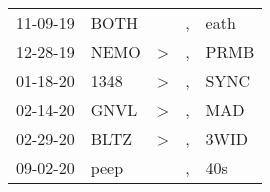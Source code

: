 \begin{supertabular}{p{0.07\textwidth}p{0.06\textwidth}p{0.02\textwidth}p{0.02\textwidth}p{0.06\textwidth}}
 11-09-19\textsuperscript{} &  BOTH\textsuperscript{} &                  &             , &           eath\textsuperscript{} \\
 12-28-19\textsuperscript{} &  NEMO\textsuperscript{} &     \textgreater &             , &           PRMB\textsuperscript{} \\
 01-18-20\textsuperscript{} &  1348\textsuperscript{} &     \textgreater &             , &           SYNC\textsuperscript{} \\
 02-14-20\textsuperscript{} &  GNVL\textsuperscript{} &     \textgreater &             , &            MAD\textsuperscript{} \\
 02-29-20\textsuperscript{} &  BLTZ\textsuperscript{} &     \textgreater &             , &           3WID\textsuperscript{} \\
 09-02-20\textsuperscript{} &  peep\textsuperscript{} &                  &             , &            40s\textsuperscript{} \\
\end{supertabular}
